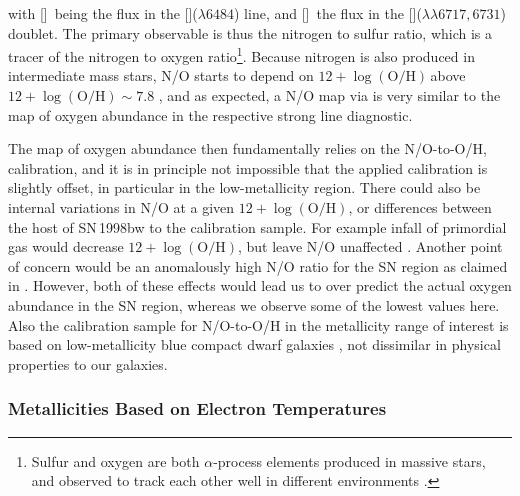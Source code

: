 \documentclass[traditabstract]{aa}
\newcommand{\oh}{12+\log(\mathrm{O/H})}
\newcommand{\sii}{[\ion{S}{ii}]}
\newcommand{\nii}{[\ion{N}{ii}]}
\begin{document}
with \nii\, being the flux in the \nii($\lambda6484$) line, and \sii\, the flux in the \sii($\lambda\lambda6717,6731$) doublet. The primary observable is thus the nitrogen to sulfur ratio, which is a tracer of the nitrogen to oxygen ratio\footnote{Sulfur and oxygen are both $\alpha$-process elements produced in massive stars, and observed to track each other well in different environments \citep[see e.g. Figure 6 in][]{2006A&A...448..955I}.}. Because nitrogen is also produced in intermediate mass stars, N/O starts to depend on $\oh$\,above $\oh\sim 7.8$ \citep[e.g.][]{1999ApJ...511..639I, 2013A&A...549A..25P, 2016A&A...595A..62P}, and as expected, a N/O map via \citet{2010ApJ...715L.128A} is very similar to the map of oxygen abundance in the respective strong line diagnostic. 

The map of oxygen abundance then fundamentally relies on the N/O-to-O/H, calibration, and it is in principle not impossible that the applied calibration is slightly offset, in particular in the low-metallicity region. There could also be internal variations in N/O at a given $\oh$, or differences between the host of SN\,1998bw to the calibration sample. For example infall of primordial gas would decrease $\oh$, but leave N/O unaffected \citep{2016ApJ...823L..24K}. Another point of concern would be an anomalously high N/O ratio for the SN region as claimed in \citet{2006A&A...454..103H}. However, both of these effects would lead us to over predict the actual oxygen abundance in the SN region, whereas we observe some of the lowest values here. Also the calibration sample for N/O-to-O/H in the metallicity range of interest is based on low-metallicity blue compact dwarf galaxies \citep{1999ApJ...511..639I}, not dissimilar in physical properties to our galaxies. 


\subsubsection{Metallicities Based on Electron Temperatures}
\end{document}
